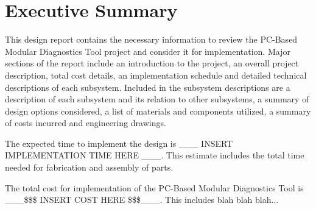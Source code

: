 \section*{Executive Summary}
This design report contains the necessary information to review the PC-Based Modular 
Diagnostics Tool project and consider it for implementation. Major sections of the
report include an introduction to the project, an overall project description,
total cost details, an implementation schedule and detailed technical descriptions of each
subsystem. Included in the subsystem descriptions are a description of each subsystem
and its relation to other subsystems, a summary of design options considered, a list 
of materials and components utilized, a summary of costs incurred and engineering drawings.

The expected time to implement the design is \_\_\_ INSERT IMPLEMENTATION TIME HERE \_\_\_.
This estimate includes the total time needed for fabrication and assembly of parts.

The total cost for implementation of the PC-Based Modular Diagnostics Tool is 
\_\_\_\$\$\$ INSERT COST HERE \$\$\$\_\_\_. This includes blah blah blah...


